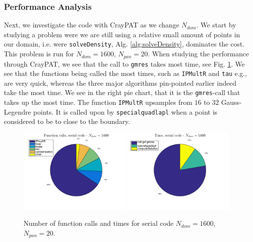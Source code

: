 \documentclass[a4paper,10pt]{article}
\def\code#1{\texttt{#1}}
\begin{document}
\subsubsection*{Performance Analysis}
Next, we investigate the code with CrayPAT as we change $N_{dom}$. We start by studying a problem were we are still using a relative small amount of points in our domain, i.e. were \texttt{solveDensity}, Alg. \ref{alg:solveDensity}, dominates the cost. This problem is run for $N_{dom} = 1600$, $N_{pan}=20$. When studying the performance through CrayPAT, we see that the call to \texttt{gmres} takes most time, see Fig. \ref{fig:batch4_serial_pie}. We see that the functions being called the most times, such as \texttt{IPMultR} and \texttt{tau} e.g., are very quick, whereas the three major algorithms pin-pointed earlier indeed take the most time. We see in the right pie chart, that it is the \texttt{gmres}-call that takes up the most time. The function \texttt{IPMultR} upsamples from $16$ to $32$ Gauss-Legendre points. It is called upon by \code{specialquadlapl} when a point is considered to be to close to the boundary. 
\begin{figure}[ht]
    \begin{center}
        \includegraphics[width=0.49\textwidth]{Graphics/craypat_serial_batch4_calls_pie.png}
        \includegraphics[width=0.49\textwidth]{Graphics/craypat_serial_batch4_time_pie.png}
    \end{center}
    \caption{Number of function calls and times for serial code $N_{dom} = 1600$, $N_{pan} = 20$.}
    \label{fig:batch4_serial_pie}
\end{figure}
\end{document}
